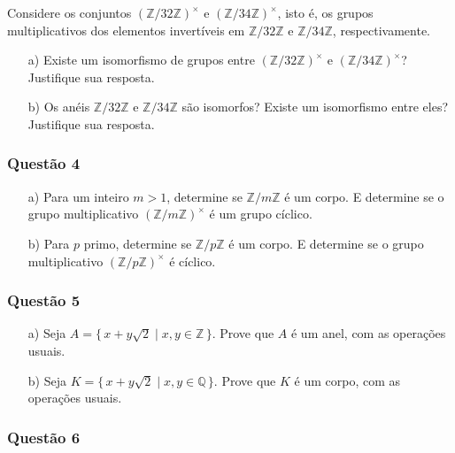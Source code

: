     Considere os conjuntos $(\mathbb{Z}/32\mathbb{Z})^\times$ e $(\mathbb{Z}/34\mathbb{Z})^\times$, isto é, os grupos multiplicativos dos elementos invertíveis em $\mathbb{Z}/32\mathbb{Z}$ e $\mathbb{Z}/34\mathbb{Z}$, respectivamente.

    \begin{enumerate}
        \item[a)] Existe um isomorfismo de grupos entre $(\mathbb{Z}/32\mathbb{Z})^\times$ e $(\mathbb{Z}/34\mathbb{Z})^\times$? Justifique sua resposta.
        \item[b)] Os anéis $\mathbb{Z}/32\mathbb{Z}$ e $\mathbb{Z}/34\mathbb{Z}$ são isomorfos? Existe um isomorfismo entre eles? Justifique sua resposta.
    \end{enumerate}

    \subsubsection*{Questão 4}

    \begin{enumerate}
        \item[a)] Para um inteiro $m > 1$, determine se $\mathbb{Z}/m\mathbb{Z}$ é um corpo. E determine se o grupo multiplicativo $(\mathbb{Z}/m\mathbb{Z})^{\times}$ é um grupo cíclico.
        \item[b)] Para $p$ primo, determine se $\mathbb{Z}/p\mathbb{Z}$ é um corpo. E determine se o grupo multiplicativo $(\mathbb{Z}/p\mathbb{Z})^{\times}$ é cíclico.
    \end{enumerate}

    \vspace{1em}

    \subsubsection*{Questão 5}

    \begin{enumerate}
        \item[a)] Seja $A = \{\, x + y \sqrt{2} \mid x, y \in \mathbb{Z} \,\}$. Prove que $A$ é um anel, com as operações usuais.
        \item[b)] Seja $K = \{\, x + y \sqrt{2} \mid x, y \in \mathbb{Q} \,\}$. Prove que $K$ é um corpo, com as operações usuais.
    \end{enumerate}

    \subsubsection*{Questão 6}

